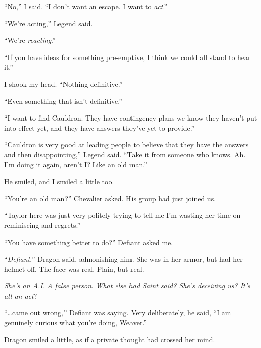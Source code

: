 ``No,'' I said.  ``I don't want an escape.  I want to \emph{act}.''



``We're acting,'' Legend said.



``We're \emph{reacting}.''



``If you have ideas for something pre-emptive, I think we could all stand to hear it.''



I shook my head.  ``Nothing definitive.''



``Even something that isn't definitive.''



``I want to find Cauldron.  They have contingency plans we know they haven't put into effect yet, and they have answers they've yet to provide.''



``Cauldron is very good at leading people to believe that they have the answers and then disappointing,'' Legend said.  ``Take it from someone who knows.  Ah.  I'm doing it again, aren't I?  Like an old man.''



He smiled, and I smiled a little too.



``You're an old man?''  Chevalier asked.  His group had just joined us.



``Taylor here was just very politely trying to tell me I'm wasting her time on reminiscing and regrets.''



``You have something better to do?'' Defiant asked me.



``\emph{Defiant},'' Dragon said, admonishing him.  She was in her armor, but had her helmet off.  The face was real.  Plain, but real.



\emph{She's an A.I.  A false person.  What else had Saint said?  She's deceiving us?  It's all an act}?



``\ldots{}came out wrong,'' Defiant was saying.  Very deliberately, he said, ``I am genuinely curious what you're doing, Weaver.''



Dragon smiled a little, as if a private thought had crossed her mind.



